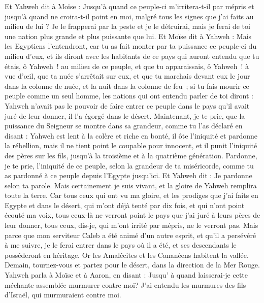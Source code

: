 \begin{multicols}{2}
Et Yahweh dit à Moïse : Jusqu'à quand ce peuple-ci m’irritera-t-il par mépris et jusqu'à quand ne croira-t-il point en moi, malgré tous les signes que j'ai faits au milieu de lui ?
Je le frapperai par la peste et je le détruirai, mais je ferai de toi une nation plus grande et plus puissante que lui.
Et Moïse dit à Yahweh : Mais les Egyptiens l'entendront, car tu as fait monter par ta puissance ce peuple-ci du milieu d'eux,
et ils diront avec les habitants de ce pays qui auront entendu que tu étais, ô Yahweh ! au milieu de ce peuple, et que tu apparaissais, ô Yahweh ! à vue d’œil, que ta nuée s’arrêtait sur eux, et que tu marchais devant eux le jour dans la colonne de nuée, et la nuit dans la colonne de feu ;
si tu fais mourir ce peuple comme un seul homme, les nations qui ont entendu parler de toi diront :
Yahweh n'avait pas le pouvoir de faire entrer ce peuple dans le pays qu'il avait juré de leur donner, il l'a égorgé dans le désert.
Maintenant, je te prie, que la puissance du Seigneur se montre dans sa grandeur, comme tu l'as déclaré en disant :
Yahweh est lent à la colère et riche en bonté, il ôte l'iniquité et pardonne la rébellion, mais il ne tient point le coupable pour innocent, et il punit l'iniquité des pères sur les fils, jusqu'à la troisième et à la quatrième génération.
Pardonne, je te prie, l'iniquité de ce peuple, selon la grandeur de ta miséricorde, comme tu as pardonné à ce peuple depuis l'Egypte jusqu'ici.
Et Yahweh dit : Je pardonne selon ta parole.
Mais certainement je suis vivant, et la gloire de Yahweh remplira toute la terre.
Car tous ceux qui ont vu ma gloire, et les prodiges que j'ai faits en Egypte et dans le désert, qui m'ont déjà tenté par dix fois, et qui n'ont point écouté ma voix,
tous ceux-là ne verront point le pays que j'ai juré à leurs pères de leur donner, tous ceux, dis-je, qui m'ont irrité par mépris, ne le verront pas.
Mais parce que mon serviteur Caleb a été animé d'un autre esprit, et qu'il a persévéré à me suivre, je le ferai entrer dans le pays où il a été, et ses descendants le posséderont en héritage.
Or les Amalécites et les Cananéens habitent la vallée. Demain, tournez-vous et partez pour le désert, dans la direction de la Mer Rouge.
Yahweh parla à Moïse et à Aaron, en disant :
Jusqu' à quand laisserai-je cette méchante assemblée murmurer contre moi? J'ai entendu les murmures des fils d'Israël, qui murmuraient contre moi.

\end{multicols}
